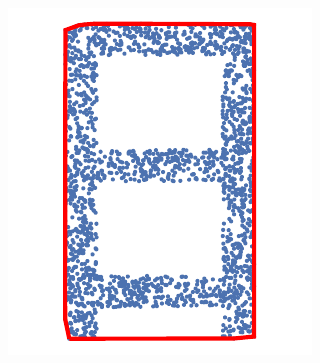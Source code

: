 

\begin{figure}[t]

  \begin{subfigure}[t]{.22\linewidth}
    \centering\includegraphics[width=.95\linewidth]{chapter_3_polylidar3d/imgs/concave_vs_convex_lettera_1.pdf}
    \caption{\label{fig:ch1_convex_concave_1}}
  \end{subfigure}
  \begin{subfigure}[t]{.22\linewidth}

\end{subfigure}
\end{figure}
